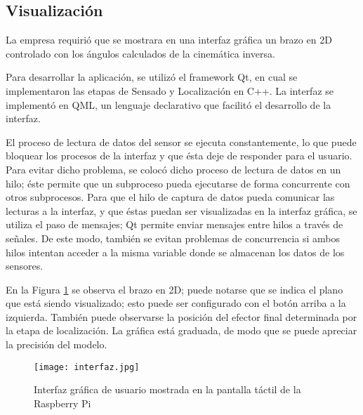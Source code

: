 \subsection{Visualización}

La empresa requirió que se mostrara en una interfaz gráfica un brazo en 2D controlado con los ángulos calculados de la cinemática inversa.

Para desarrollar la aplicación, se utilizó el framework Qt, en cual se implementaron las etapas de Sensado y Localización en C++. La interfaz se implementó en QML, un lenguaje declarativo que facilitó el desarrollo de la interfaz.

El proceso de lectura de datos del sensor se ejecuta constantemente, lo que puede bloquear los procesos de la interfaz y que ésta deje de responder para el usuario. Para evitar dicho problema, se colocó dicho proceso de lectura de datos en un hilo; éste permite que un subproceso pueda ejecutarse de forma concurrente con otros subprocesos. Para que el hilo de captura de datos pueda comunicar las lecturas a la interfaz, y que éstas puedan ser visualizadas en la interfaz gráfica, se utiliza el paso de mensajes; Qt permite enviar mensajes entre hilos a través de señales. De este modo, también se evitan problemas de concurrencia si ambos hilos intentan acceder a la misma variable donde se almacenan los datos de los sensores.

En la Figura \ref{fig:interfaz} se observa el brazo en 2D; puede notarse que se indica el plano que está siendo visualizado; esto puede ser configurado con el botón arriba a la izquierda. También puede observarse la posición del efector final determinada por la etapa de localización. La gráfica está graduada, de modo que se puede apreciar la precisión del modelo.

\begin{figure}[htb]
	\centering
	\texttt{[image: interfaz.jpg]}
	\caption{Interfaz gráfica de usuario mostrada en la pantalla táctil de la Raspberry Pi}
	\label{fig:interfaz}
\end{figure}